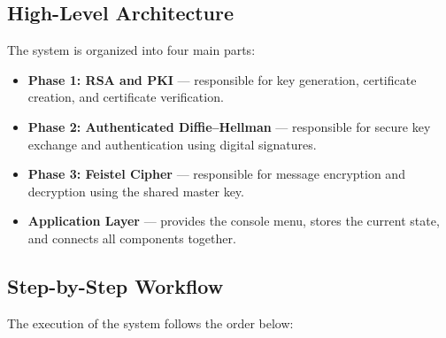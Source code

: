 \documentclass[12pt]{article}
\begin{document}
\subsection{High-Level Architecture}
The system is organized into four main parts:
\begin{itemize}
    \item \textbf{Phase 1: RSA and PKI} --- responsible for key generation, certificate creation, and certificate verification.
    \item \textbf{Phase 2: Authenticated Diffie--Hellman} --- responsible for secure key exchange and authentication using digital signatures.
    \item \textbf{Phase 3: Feistel Cipher} --- responsible for message encryption and decryption using the shared master key.
    \item \textbf{Application Layer} --- provides the console menu, stores the current state, and connects all components together.
\end{itemize}

\subsection{Step-by-Step Workflow}
The execution of the system follows the order below:
\end{document}
